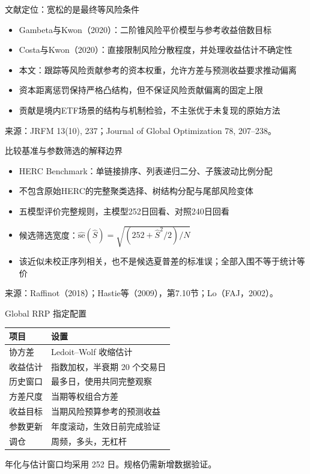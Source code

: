 \documentclass[aspectratio=169,11pt]{beamer}
\begin{document}
\begin{frame}{文献定位：宽松的是最终等风险条件}
\small
\begin{itemize}
\item Gambeta与Kwon（2020）：二阶锥风险平价模型与参考收益倍数目标
\item Costa与Kwon（2020）：直接限制风险分散程度，并处理收益估计不确定性
\item 本文：跟踪等风险贡献参考的资本权重，允许方差与预测收益要求推动偏离
\item 资本距离惩罚保持严格凸结构，但不保证风险贡献偏离的固定上限
\item 贡献是境内ETF场景的结构与机制检验，不主张优于未复现的原始方法
\end{itemize}
\medskip\scriptsize 来源：JRFM 13(10), 237；Journal of Global Optimization 78, 207--238。
\end{frame}
\begin{frame}{比较基准与参数筛选的解释边界}
\small
\begin{itemize}
\item HERC Benchmark：单链接排序、列表递归二分、子簇波动比例分配
\item 不包含原始HERC的完整聚类选择、树结构分配与尾部风险变体
\item 五模型评价完整规则，主模型252日回看、对照240日回看
\item 候选筛选宽度：$\widehat{\mathrm{se}}(\widehat S)=\sqrt{(252+\widehat S^2/2)/N}$
\item 该近似未校正序列相关，也不是候选夏普差的标准误；全部入围不等于统计等价
\end{itemize}
\medskip\scriptsize 来源：Raffinot（2018）；Hastie等（2009），第7.10节；Lo（FAJ，2002）。
\end{frame}
\begin{frame}{Global RRP 指定配置}
\begin{tabular}{ll}\toprule
项目 & 设置\\\midrule
协方差 & Ledoit--Wolf 收缩估计\\
收益估计 & 指数加权，半衰期 20 个交易日\\
历史窗口 & 最多\lookbackDays{}日，使用共同完整观察\\
方差尺度 & 当期等权组合方差\\
收益目标 & 当期风险预算参考的预测收益\\
参数更新 & 年度滚动，生效日前完成验证\\
调仓 & 周频，多头，无杠杆\\\bottomrule
\end{tabular}
\par\medskip
\small 年化与估计窗口均采用 252 日。规格仍需新增数据验证。
\end{frame}
\end{document}
